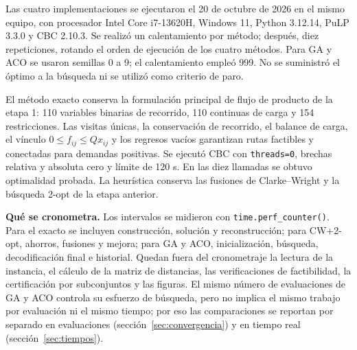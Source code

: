 \documentclass[11pt,a4paper]{article}
\numberwithin{equation}{section}
\begin{document}
Las cuatro implementaciones se ejecutaron el 20 de octubre de 2026 en el mismo equipo, con procesador Intel Core i7-13620H, Windows 11, Python 3.12.14, PuLP 3.3.0 y CBC 2.10.3. Se realizó un calentamiento por método; después, diez repeticiones, rotando el orden de ejecución de los cuatro métodos. Para GA y ACO se usaron semillas 0 a 9; el calentamiento empleó 999. No se suministró el óptimo a la búsqueda ni se utilizó como criterio de paro.

El método exacto conserva la formulación principal de flujo de producto de la etapa 1: 110 variables binarias de recorrido, 110 continuas de carga y 154 restricciones. Las visitas únicas, la conservación de recorrido, el balance de carga, el vínculo \(0\le f_{ij}\le Qx_{ij}\) y los regresos vacíos garantizan rutas factibles y conectadas para demandas positivas. Se ejecutó CBC con \texttt{threads=0}, brechas relativa y absoluta cero y límite de 120 s. En las diez llamadas se obtuvo optimalidad probada. La heurística conserva las fusiones de Clarke--Wright y la búsqueda 2-opt de la etapa anterior.

\textbf{Qué se cronometra.} Los intervalos se midieron con \texttt{time.perf\_counter()}. Para el exacto se incluyen construcción, solución y reconstrucción; para CW+2-opt, ahorros, fusiones y mejora; para GA y ACO, inicialización, búsqueda, decodificación final e historial. Quedan fuera del cronometraje la lectura de la instancia, el cálculo de la matriz de distancias, las verificaciones de factibilidad, la certificación por subconjuntos y las figuras. El mismo número de evaluaciones de GA y ACO controla su esfuerzo de búsqueda, pero no implica el mismo trabajo por evaluación ni el mismo tiempo; por eso las comparaciones se reportan por separado en evaluaciones (sección~\ref{sec:convergencia}) y en tiempo real (sección~\ref{sec:tiempos}).
\end{document}
